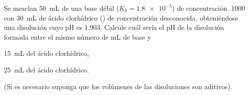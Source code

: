 Se mezclan \SI{50}{\milli\liter} de una base débil ($K_b = \num{1,8e-5}$) de concentración \SI{,1000}{\Molar} con \SI{30}{\milli\liter} de ácido clorhídrico () de concentración desconocida, obteniéndose una disolución cuyo pH es \num{1,903}. Calcule cuál sería el pH de la disolución formada entre el mismo número de \si{\milli\liter} de base y 
\begin{enumerate*}[label={\alph*)},font=\bfseries]
	\item\SI{15}{\milli\liter} del ácido clorhídrico,
	\item\SI{25}{\milli\liter} del ácido clorhídrico.
\end{enumerate*}
(Si es necesario suponga que los volúmenes de las disoluciones son aditivos).
